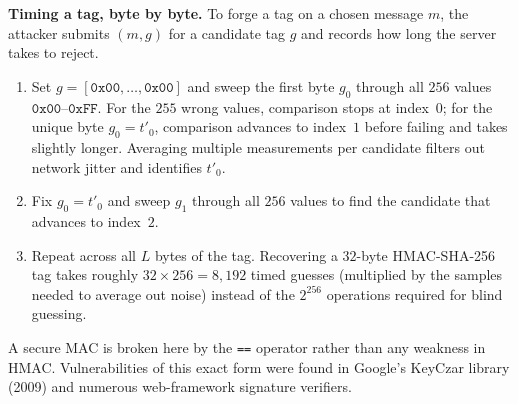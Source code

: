 \begin{attackbox}
\textbf{Timing a tag, byte by byte.} To forge a tag on a chosen message $m$, the attacker submits $(m, g)$ for a candidate tag $g$ and records how long the server takes to reject.
\begin{enumerate}
  \item Set $g = [\texttt{0x00}, \dots, \texttt{0x00}]$ and sweep the first byte $g_0$ through all $256$ values $\texttt{0x00}$--$\texttt{0xFF}$. For the $255$ wrong values, comparison stops at index~$0$; for the unique byte $g_0 = t'_0$, comparison advances to index~$1$ before failing and takes slightly longer. Averaging multiple measurements per candidate filters out network jitter and identifies $t'_0$.
  \item Fix $g_0 = t'_0$ and sweep $g_1$ through all $256$ values to find the candidate that advances to index~$2$.
  \item Repeat across all $L$ bytes of the tag. Recovering a $32$-byte HMAC-SHA-256 tag takes roughly $32 \times 256 = 8{,}192$ timed guesses (multiplied by the samples needed to average out noise) instead of the $2^{256}$ operations required for blind guessing.
\end{enumerate}
A secure MAC is broken here by the \texttt{==} operator rather than any weakness in HMAC. Vulnerabilities of this exact form were found in Google's KeyCzar library (2009) and numerous web-framework signature verifiers.
\end{attackbox}

